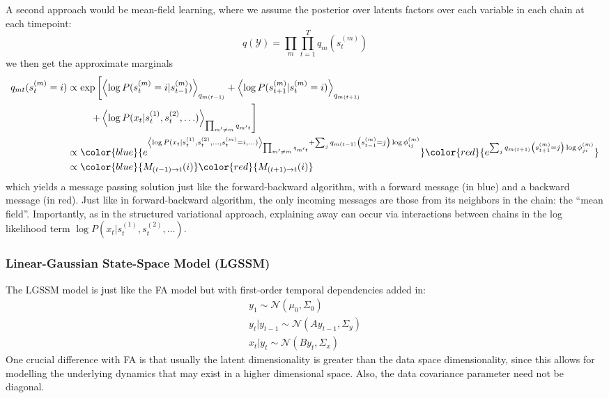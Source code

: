 \documentclass[a4paper]{article}
\begin{document}
A second approach would be mean-field learning, where we assume the posterior over latents factors over each variable in each chain at each timepoint:
\[ q(\mathcal{Y}) = \prod_m\prod_{t=1}^T q_m(s_t^{(m)}) \]
we then get the approximate marginals
\begin{align*}
q_{mt}(s_t^{(m)} = i) &\propto \exp\left[\left\langle \log P(s_t^{(m)} = i|s_{t-1}^{(m)})\right\rangle_{q_{m(t-1)}} + \left\langle\log P(s_{t+1}^{(m)}|s_t^{(m)} = i)\right\rangle_{q_{m(t+1)}} \right. \\
&\phantom{{} = 15} \left. + \left\langle\log P(x_t|s_t^{(1)},s_t^{(2)},\ldots)\right\rangle_{\prod_{m' \neq m} q_{m't}} \right] \\
&\propto \color{blue}{e^{ \left\langle\log P(x_t|s_t^{(1)},s_t^{(2)},\ldots,s_t^{(m)} = i,\ldots)\right\rangle_{\prod_{m' \neq m} q_{m't}} + \sum_j q_{m(t-1)}\left(s_{t-1}^{(m)} = j\right)\log \phi_{ij}^{(m)}}} \color{red}{e^{\sum_j q_{m(t+1)}\left(s_{t+1}^{(m)} = j\right)\log \phi_{ji}^{(m)}}} \\
&\propto \color{blue}{M_{(t-1) \rightarrow t}(i)} \color{red}{M_{(t+1) \rightarrow t}(i)}
\end{align*}
which yields a message passing solution just like the forward-backward algorithm, with a forward message (in blue) and a backward message (in red). Just like in forward-backward algorithm, the only incoming messages are those from its neighbors in the chain: the ``mean field''. Importantly, as in the structured variational approach, explaining away can occur via interactions between chains in the log likelihood term $\log P(x_t|s_t^{(1)},s_t^{(2)},\ldots)$.

\subsubsection{Linear-Gaussian State-Space Model (LGSSM)}
The LGSSM model is just like the FA model but with first-order temporal dependencies added in:
\begin{gather*}
y_1 \sim \mathcal{N}(\mu_0,\Sigma_0) \\
y_t|y_{t-1} \sim \mathcal{N}(Ay_{t-1},\Sigma_y) \\
x_t|y_t \sim \mathcal{N}(By_t,\Sigma_x)
\end{gather*}
One crucial difference with FA is that usually the latent dimensionality is greater than the data space dimensionality, since this allows for modelling the underlying dynamics that may exist in a higher dimensional space. Also, the data covariance parameter need not be diagonal.
\end{document}

